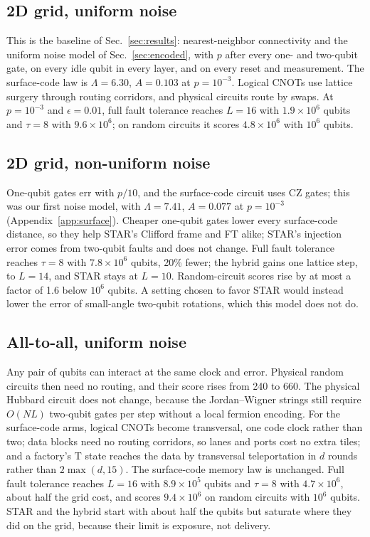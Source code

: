 \documentclass[11pt]{article}
\newcommand{\eps}{\epsilon}
\begin{document}
\subsection{2D grid, uniform noise}\label{sec:hw-grid-uniform}
This is the baseline of Sec.~\ref{sec:results}: nearest-neighbor connectivity
and the uniform noise model of Sec.~\ref{sec:encoded}, with $p$ after every one-
and two-qubit gate, on every idle qubit in every layer, and on every reset and
measurement. The surface-code law is $\Lambda=6.30$, $A=0.103$ at $p=10^{-3}$.
Logical CNOTs use lattice surgery through routing corridors, and physical
circuits route by swaps. At $p=10^{-3}$ and $\eps=0.01$, full fault tolerance
reaches $L=16$ with $1.9\times10^6$ qubits and $\tau=8$ with $9.6\times10^6$;
on random circuits it scores $4.8\times10^6$ with $10^6$ qubits.

\subsection{2D grid, non-uniform noise}\label{sec:hw-grid-nonuniform}
One-qubit gates err with $p/10$, and the surface-code circuit uses CZ gates; this
was our first noise model, with $\Lambda=7.41$, $A=0.077$ at $p=10^{-3}$
(Appendix~\ref{app:surface}). Cheaper one-qubit gates lower every
surface-code distance, so they help STAR's Clifford frame and FT alike;
STAR's injection error comes from two-qubit faults and does not change. Full
fault tolerance reaches $\tau=8$ with $7.8\times10^6$ qubits, 20\% fewer; the
hybrid gains one lattice step, to $L=14$, and STAR stays at $L=10$. Random-circuit
scores rise by at most a factor of 1.6 below $10^6$ qubits. A setting
chosen to favor STAR would instead lower the error of small-angle two-qubit
rotations, which this model does not do.

\subsection{All-to-all, uniform noise}\label{sec:hw-a2a-uniform}
Any pair of qubits can interact at the same clock and error. Physical random
circuits then need no routing, and their score rises from 240 to 660. The
physical Hubbard circuit does not change, because the Jordan--Wigner strings
still require $O(NL)$ two-qubit gates per step without a local fermion
encoding. For the surface-code arms, logical CNOTs become transversal, one code
clock rather than two; data blocks need no routing corridors, so lanes and
ports cost no extra tiles; and a factory's T state reaches the data by
transversal teleportation in $d$ rounds rather than $2\max(d,15)$. The
surface-code memory law is unchanged. Full fault tolerance reaches $L=16$ with
$8.9\times10^5$ qubits and $\tau=8$ with $4.7\times10^6$, about half the grid
cost, and scores $9.4\times10^6$ on random circuits with $10^6$ qubits. STAR and
the hybrid start with about half the qubits but saturate where they did on
the grid, because their limit is exposure, not delivery.
\end{document}
